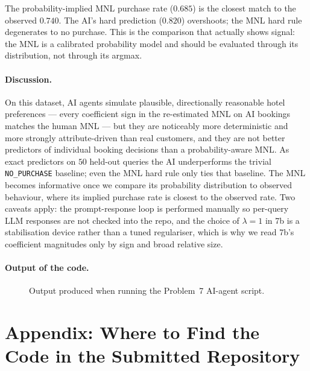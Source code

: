 \documentclass[11pt]{article}
\begin{document}
The probability-implied MNL purchase rate ($0.685$) is the closest
match to the observed $0.740$. The AI's hard prediction
($0.820$) overshoots; the MNL hard rule degenerates to no purchase.
This is the comparison that actually shows signal: the MNL is a
calibrated probability model and should be evaluated through its
distribution, not through its argmax.

\paragraph{Discussion.}
On this dataset, AI agents simulate plausible, directionally reasonable
hotel preferences --- every coefficient sign in the re-estimated MNL on
AI bookings matches the human MNL --- but they are noticeably more
deterministic and more strongly attribute-driven than real customers,
and they are not better predictors of individual booking decisions
than a probability-aware MNL. As exact predictors on $50$ held-out
queries the AI underperforms the trivial \texttt{NO\_PURCHASE}
baseline; even the MNL hard rule only ties that baseline. The MNL
becomes informative once we compare its probability distribution to
observed behaviour, where its implied purchase rate is closest to the
observed rate. Two caveats apply: the prompt-response loop is
performed manually so per-query LLM responses are not checked into
the repo, and the choice of $\lambda = 1$ in 7b is a stabilisation
device rather than a tuned regulariser, which is why we read 7b's
coefficient magnitudes only by sign and broad relative size.

\paragraph{Output of the code.}
\begin{figure}[h!]
  \centering
  \caption{Output produced when running the Problem~7 AI-agent script.}
\end{figure}

\FloatBarrier
\newpage

\appendix
\section*{Appendix: Where to Find the Code in the Submitted Repository}
\end{document}
